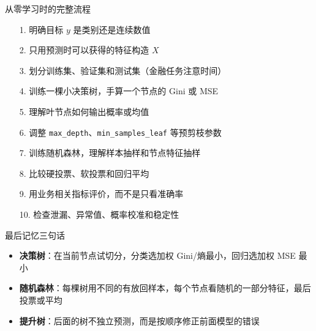 \documentclass[10pt,aspectratio=43]{beamer}
\begin{document}
\begin{frame}{从零学习时的完整流程}
  \begin{itemize}\small
    \item[1.] 明确目标 $y$ 是类别还是连续数值
    \item[2.] 只用预测时可以获得的特征构造 $X$
    \item[3.] 划分训练集、验证集和测试集（金融任务注意时间）
    \item[4.] 训练一棵小决策树，手算一个节点的 Gini 或 MSE
    \item[5.] 理解叶节点如何输出概率或均值
    \item[6.] 调整 \texttt{max\_depth}、\texttt{min\_samples\_leaf} 等预剪枝参数
    \item[7.] 训练随机森林，理解样本抽样和节点特征抽样
    \item[8.] 比较硬投票、软投票和回归平均
    \item[9.] 用业务相关指标评价，而不是只看准确率
    \item[10.] 检查泄漏、异常值、概率校准和稳定性
  \end{itemize}
\end{frame}

\begin{frame}{最后记忆三句话}
  \vfill
  \begin{itemize}
    \item \textbf{决策树}：在当前节点试切分，分类选加权 Gini/熵最小，回归选加权 MSE 最小
    \item \textbf{随机森林}：每棵树用不同的有放回样本，每个节点看随机的一部分特征，最后投票或平均
    \item \textbf{提升树}：后面的树不独立预测，而是按顺序修正前面模型的错误
  \end{itemize}
  \vfill
\end{frame}
\end{document}
